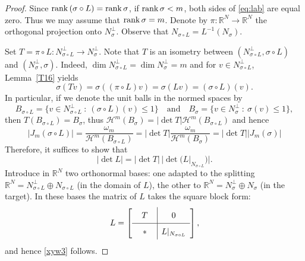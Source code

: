 \documentclass[12pt,leqno]{amsart}
\theoremstyle{definition}
\newcommand{\bbbr}{\mathbb R}
\def\H{{\mathcal H}}
\def\rank{{\rm rank\,}}
\numberwithin{theorem}{section} \numberwithin{equation}{section}
\begin{document}
\begin{proof}
Since $\rank (\sigma\circ L)=\rank\sigma$, if $\rank\sigma<m$, both sides of \eqref{eq:lab} are equal zero. Thus we may assume that $\rank\sigma=m$.
Denote by $\pi:\bbbr^N\to\bbbr^N$ the orthogonal projection onto $N_\sigma^\perp$. Observe that $N_{\sigma\circ L}=L^{-1}(N_\sigma)$.

Set $T=\pi\circ L:N_{\sigma\circ L}^\perp \to N_\sigma^\perp$.
Note that $T$ is an isometry between $(N_{\sigma\circ L}^\perp, \sigma\circ L)$ and $(N_\sigma^\perp,\sigma)$. Indeed,
$\dim N_{\sigma\circ L}^\perp=\dim N_\sigma^\perp=m$ and
for $v\in N_{\sigma\circ L}^\perp$, Lemma~\ref{T16} yields
$$
\sigma(Tv)=\sigma ((\pi\circ L)v)=\sigma(Lv)=(\sigma\circ L)(v).
$$
In particular, if we denote the unit balls in the normed spaces by
$$
B_{\sigma\circ L}=\{v\in N_{\sigma\circ L}^\perp~:~(\sigma\circ L)(v)\leq 1\}
\quad
\text{and}
\quad
B_\sigma=\{v\in N_\sigma^\perp~:~\sigma(v)\leq 1\},
$$
then $T(B_{\sigma\circ L})=B_\sigma$, thus
$\H^m(B_\sigma)=|\det T|\H^m(B_{\sigma\circ L})$ and hence
$$
|J_m(\sigma\circ L)|=\frac{\omega_m}{\H^m(B_{\sigma\circ L})}=|\det T|\frac{\omega_m}{\H^m(B_\sigma)}=|\det T| |J_m(\sigma)|
$$
Therefore, it suffices to show that
\begin{equation}
\label{xyw3}
|\det L|=|\det T|\, |\det (L|_{N_{\sigma\circ L}})|.
\end{equation}
Introduce in $\bbbr^N$ two orthonormal bases: one adapted to the splitting $\bbbr^N=N_{\sigma\circ L}^\perp\oplus N_{\sigma\circ L}$ (in the domain of $L$), the other to $\bbbr^N=N_{\sigma}^\perp\oplus N_{\sigma}$ (in the target). In these bases the matrix of $L$ takes the square block form:
$$
L=
\left[
\begin{array}{ c | c}
  ~~T ~~\rule[-1.5ex]{0pt}{4.5ex} & 0 \\
\hline
*\rule[-1.5ex]{0pt}{4.5ex} & L|_{N_{\sigma\circ L}}
\\
\end{array}
\right],
$$
and hence \eqref{xyw3} follows.
\end{proof}
\end{document}
